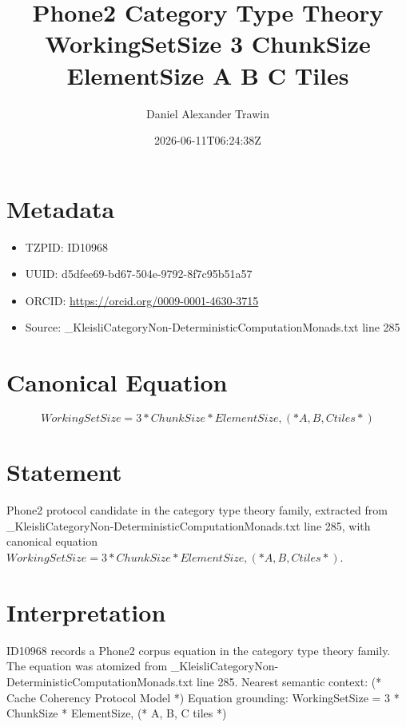 \documentclass[11pt]{article}
\title{Phone2 Category Type Theory WorkingSetSize 3 ChunkSize ElementSize A B C Tiles}
\author{Daniel Alexander Trawin}
\date{2026-06-11T06:24:38Z}
\begin{document}
\maketitle
\section*{Metadata}
\begin{itemize}
\item TZPID: ID10968
\item UUID: d5dfee69-bd67-504e-9792-8f7c95b51a57
\item ORCID: \url{https://orcid.org/0009-0001-4630-3715}
\item Source: _KleisliCategoryNon-DeterministicComputationMonads.txt line 285
\end{itemize}
\section*{Canonical Equation}
\[
WorkingSetSize = 3 * ChunkSize * ElementSize, (* A, B, C tiles *)
\]
\section*{Statement}
Phone2 protocol candidate in the category type theory family, extracted from _KleisliCategoryNon-DeterministicComputationMonads.txt line 285, with canonical equation $WorkingSetSize = 3 * ChunkSize * ElementSize, (* A, B, C tiles *)$.
\section*{Interpretation}
ID10968 records a Phone2 corpus equation in the category type theory family. The equation was atomized from _KleisliCategoryNon-DeterministicComputationMonads.txt line 285. Nearest semantic context: (* Cache Coherency Protocol Model *) Equation grounding: WorkingSetSize = 3 * ChunkSize * ElementSize, (* A, B, C tiles *)
\end{document}

